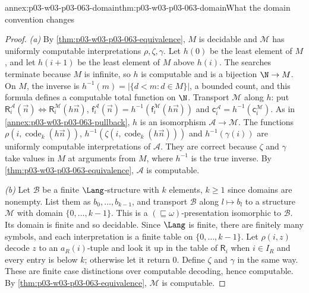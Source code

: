 \begin{annexitem}{annex:p03-w03-p03-063-domain}{thm:p03-w03-p03-063-domain}{What the domain convention changes}
\begin{proof}
\emph{(a)}  By \cref{thm:p03-w03-p03-063-equivalence}, \(M\) is decidable
and \(\mathcal M\) has uniformly computable interpretations
\(\rho,\zeta,\gamma\).  Let \(h(0)\) be the least element of \(M\), and let
\(h(i+1)\) be the least element of \(M\) above \(h(i)\).  The searches
terminate because \(M\) is infinite, so \(h\) is computable and is a bijection
\(\N\to M\).  On \(M\), the inverse is \(h^{-1}(m)=|\{d<m:d\in M\}|\), a
bounded count, and this formula defines a computable total function on \(\N\).
Transport \(\mathcal M\) along \(h\): put
\(\mathsf R_i^{\mathcal A}(\vec n)\iff\mathsf R_i^{\mathcal M}(h\vec n)\),
\(\mathsf f_i^{\mathcal A}(\vec n)=h^{-1}(\mathsf f_i^{\mathcal M}(h\vec n))\)
and \(\mathsf c_i^{\mathcal A}=h^{-1}(\mathsf c_i^{\mathcal M})\).  As in
\cref{annex:p03-w03-p03-063-pullback}, \(h\) is an isomorphism
\(\mathcal A\to\mathcal M\).  The functions
\(\rho(i,\operatorname{code}_k(h\vec n))\),
\(h^{-1}(\zeta(i,\operatorname{code}_k(h\vec n)))\) and \(h^{-1}(\gamma(i))\)
are uniformly computable interpretations of \(\mathcal A\).  They are correct
because \(\zeta\) and \(\gamma\) take values in \(M\) at arguments from \(M\),
where \(h^{-1}\) is the true inverse.  By
\cref{thm:p03-w03-p03-063-equivalence}, \(\mathcal A\) is computable.

\emph{(b)}  Let \(\mathcal B\) be a finite \(\Lang\)-structure with \(k\)
elements, \(k\geq1\) since domains are nonempty.  List them as
\(b_0,\ldots,b_{k-1}\), and transport \(\mathcal B\) along \(l\mapsto b_l\) to
a structure \(\mathcal M\) with domain \(\{0,\ldots,k-1\}\).  This is a
\((\sqsubseteq\omega)\)-presentation isomorphic to \(\mathcal B\).  Its
domain is finite and so decidable.  Since \(\Lang\) is finite, there are
finitely many symbols, and each interpretation is a finite table on
\(\{0,\ldots,k-1\}\).  Let \(\rho(i,z)\) decode \(z\) to an \(a_R(i)\)-tuple
and look it up in the table of \(\mathsf R_i\) when \(i\in I_R\) and every
entry is below \(k\); otherwise let it return \(0\).  Define \(\zeta\) and
\(\gamma\) in the same way.  These are finite case distinctions over
computable decoding, hence computable.  By
\cref{thm:p03-w03-p03-063-equivalence}, \(\mathcal M\) is computable.


\end{proof}
\end{annexitem}
